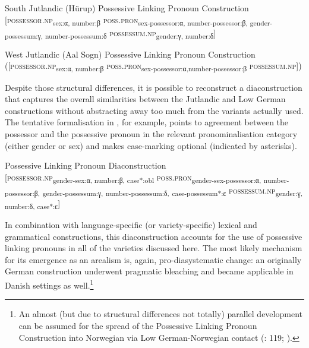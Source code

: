 \documentclass[output=paper]{langsci/langscibook}
\begin{document}
%
 
\ea\label{ex:hoeder:18}
	\ea\label{ex:hoeder:18a}
	South Jutlandic (Hürup) Possessive Linking Pronoun Construction\\
     {[}\textsc{possessor.np}\textsubscript{sex:α, number:β} \textsc{poss.pron}\textsubscript{sex-possessor:α, number-possessor:β, gender-possessum:γ, number-possessum:δ} \textsc{possessum.np}\textsubscript{gender:γ, number:δ}{]}

	\ex\label{ex:hoeder:18b}
	 West Jutlandic (Aal Sogn) Possessive Linking Pronoun Construction\\
     ({[}\textsc{possessor.np}\textsubscript{sex:α, number:β} \textsc{poss.pron}\textsubscript{sex-possessor:α,}\textsubscript{number-possessor:β} \textsc{possessum.np}{]})
     \z
     \z
     
Despite those structural differences, it is possible to reconstruct a diaconstruction that captures the overall similarities between the Jutlandic and Low German constructions without abstracting away too much from the variants actually used. The tentative formalisation in , for example, points to agreement between the possessor and the possessive pronoun in the relevant pronominalisation category (either gender or sex) and makes case-marking optional (indicated by asterisks).

\ea\label{ex:hoeder:19}
	Possessive Linking Pronoun Diaconstruction\\
     {[}\textsc{possessor.np}\textsubscript{gender-sex:α, number:β, case*:obl} \textsc{poss.pron}\textsubscript{gender-sex-possessor:α,} \textsubscript{number-possessor:β,} \textsubscript{gender-possessum:γ,} \textsubscript{number-possessum:δ,} \textsubscript{case-possessum*:ε} \textsc{possessum.np}\textsubscript{gender:γ, number:δ, case*:ε}{]}
 \z
 
 
In combination with language-specific (or variety-specific) lexical and grammatical constructions, this diaconstruction accounts for the use of possessive linking pronouns in all of the varieties discussed here. The most likely mechanism for its emergence as an arealism is, again, pro-diasystematic change: an originally German construction underwent pragmatic bleaching and became applicable in Danish settings as well.\footnote{An almost (but due to structural differences not totally) parallel development can be assumed for the spread of the Possessive Linking Pronoun Construction into Norwegian via Low German-Norwegian contact (\citealt{Hoder.2016a}: 119; \citealt{Nesse.1998}).}
\end{document}

